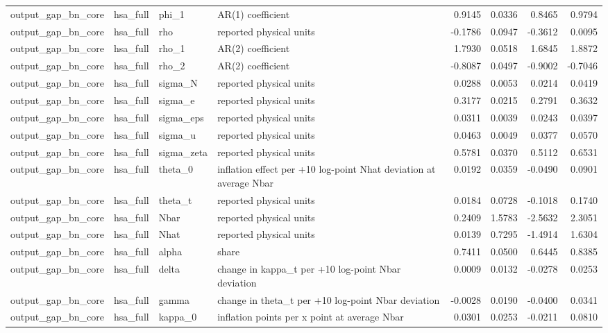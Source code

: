 \begin{tabular}{llllrrrr}
output\_gap\_bn\_core & hsa\_full & phi\_1 & AR(1) coefficient & 0.9145 & 0.0336 & 0.8465 & 0.9794 \\
output\_gap\_bn\_core & hsa\_full & rho & reported physical units & -0.1786 & 0.0947 & -0.3612 & 0.0095 \\
output\_gap\_bn\_core & hsa\_full & rho\_1 & AR(2) coefficient & 1.7930 & 0.0518 & 1.6845 & 1.8872 \\
output\_gap\_bn\_core & hsa\_full & rho\_2 & AR(2) coefficient & -0.8087 & 0.0497 & -0.9002 & -0.7046 \\
output\_gap\_bn\_core & hsa\_full & sigma\_N & reported physical units & 0.0288 & 0.0053 & 0.0214 & 0.0419 \\
output\_gap\_bn\_core & hsa\_full & sigma\_e & reported physical units & 0.3177 & 0.0215 & 0.2791 & 0.3632 \\
output\_gap\_bn\_core & hsa\_full & sigma\_eps & reported physical units & 0.0311 & 0.0039 & 0.0243 & 0.0397 \\
output\_gap\_bn\_core & hsa\_full & sigma\_u & reported physical units & 0.0463 & 0.0049 & 0.0377 & 0.0570 \\
output\_gap\_bn\_core & hsa\_full & sigma\_zeta & reported physical units & 0.5781 & 0.0370 & 0.5112 & 0.6531 \\
output\_gap\_bn\_core & hsa\_full & theta\_0 & inflation effect per +10 log-point Nhat deviation at average Nbar & 0.0192 & 0.0359 & -0.0490 & 0.0901 \\
output\_gap\_bn\_core & hsa\_full & theta\_t & reported physical units & 0.0184 & 0.0728 & -0.1018 & 0.1740 \\
output\_gap\_bn\_core & hsa\_full & Nbar & reported physical units & 0.2409 & 1.5783 & -2.5632 & 2.3051 \\
output\_gap\_bn\_core & hsa\_full & Nhat & reported physical units & 0.0139 & 0.7295 & -1.4914 & 1.6304 \\
output\_gap\_bn\_core & hsa\_full & alpha & share & 0.7411 & 0.0500 & 0.6445 & 0.8385 \\
output\_gap\_bn\_core & hsa\_full & delta & change in kappa\_t per +10 log-point Nbar deviation & 0.0009 & 0.0132 & -0.0278 & 0.0253 \\
output\_gap\_bn\_core & hsa\_full & gamma & change in theta\_t per +10 log-point Nbar deviation & -0.0028 & 0.0190 & -0.0400 & 0.0341 \\
output\_gap\_bn\_core & hsa\_full & kappa\_0 & inflation points per x point at average Nbar & 0.0301 & 0.0253 & -0.0211 & 0.0810 \\

\end{tabular}
